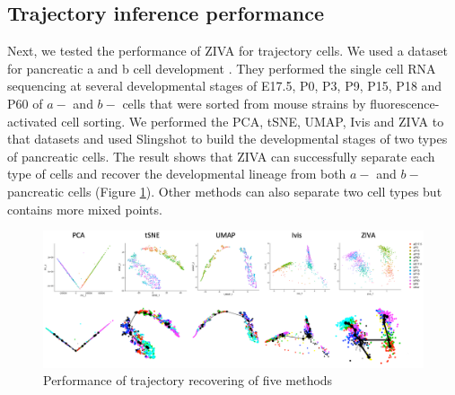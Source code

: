 \begin{table}[htb!]
\centering
\caption{ARI of clustering performance of seven methods on six datasets}
\label{ariall}
\end{table}

\clearpage

\subsection{Trajectory inference performance}
Next, we tested the performance of ZIVA for trajectory cells. We used a dataset for pancreatic a and b cell development \cite{qiu2017deciphering}. They performed the single cell RNA sequencing at several developmental stages of E17.5, P0, P3, P9, P15, P18 and P60 of $a-$ and $b-$ cells that were sorted from mouse strains by fluorescence-activated cell sorting. We performed the PCA, tSNE, UMAP, Ivis and ZIVA to that datasets and used Slingshot \cite{street2018slingshot} to build the developmental stages of two types of pancreatic cells. The result shows that ZIVA can successfully separate each type of cells and recover the developmental lineage from both $a-$ and $b-$ pancreatic cells (Figure \ref{traj}). Other methods can also separate two cell types but contains more mixed points.  
\begin{figure}[htb!]
    \centering
    \includegraphics[width=1\textwidth]{figures/myfigures/traj.png}
    \caption{Performance of trajectory recovering of five methods}
    \label{traj}
\end{figure}

